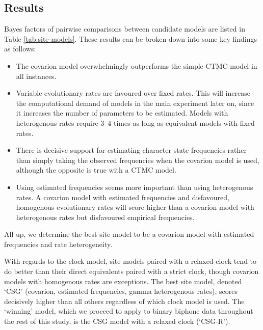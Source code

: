 \hypertarget{results-prelim-1}{%
\subsection{Results}\label{results-prelim-1}}

Bayes factors of pairwise comparisons between candidate models are listed in Table \ref{tab:site-models}. These results can be broken down into some key findings as follows:

\begin{itemize}
\tightlist
\item
  The covarion model overwhelmingly outperforms the simple CTMC model in all instances.
\item
  Variable evolutionary rates are favoured over fixed rates. This will increase the computational demand of models in the main experiment later on, since it increases the number of parameters to be estimated. Models with heterogenous rates require 3--4 times as long as equivalent models with fixed rates.
\item
  There is decisive support for estimating character state frequencies rather than simply taking the observed frequencies when the covarion model is used, although the opposite is true with a CTMC model.
\item
  Using estimated frequencies seems more important than using heterogenous rates. A covarion model with estimated frequencies and disfavoured, homogenous evolutionary rates will score higher than a covarion model with heterogenous rates but disfavoured empirical frequencies.
\end{itemize}

All up, we determine the best site model to be a covarion model with estimated frequencies and rate heterogeneity.

With regards to the clock model, site models paired with a relaxed clock tend to do better than their direct equivalents paired with a strict clock, though covarion models with homogenous rates are exceptions. The best site model, denoted `CSG' (covarion, estimated frequencies, gamma heterogenous rates), scores decisively higher than all others regardless of which clock model is used. The `winning' model, which we proceed to apply to binary biphone data throughout the rest of this study, is the CSG model with a relaxed clock (`CSG-R').

